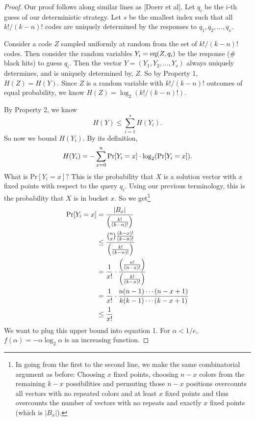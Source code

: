\documentclass[12pt, a4paper]{article}
\begin{document}
\begin{proof}
Our proof follows along similar lines as [Doerr et al]. Let $q_i$ be the $i$-th
guess of our deterministic strategy. Let $s$ be the smallest index such that all
$k!/(k-n)!$ codes are uniquely determined by the responses to $q_1, q_2, \ldots, q_s$.

Consider a code $Z$ sampled uniformly at random from the set of $k!/(k-n)!$ codes. Then
consider the random variables $Y_i = \textnormal{eq}(Z, q_i)$ be the response (\# black
hits) to guess $q_i$.
Then the vector $Y = (Y_1,Y_2,\ldots,Y_s)$ always uniquely determines, and is uniquely
determined by, $Z$. So by Property 1, $H(Z) = H(Y)$. Since $Z$ is a random
variable with $k!/(k-n)!$ outcomes of equal probability, we know
$H(Z) = \log_2(k!/(k-n)!)$.

By Property 2, we know
    \begin{equation*}
    H(Y) \leq \sum_{i=1}^s H(Y_i).
    \end{equation*}
So now we bound $H(Y_i)$. By its definition,
    \begin{equation}
    H(Y_i)=-\sum_{x=0}^n \textnormal{Pr}[Y_i=x]\cdot\log_2(\textnormal{Pr}[Y_{i}=x]).
    \end{equation}
What is Pr$[Y_i = x]$? This is the probability that $X$ is a solution vector with $x$
fixed points with respect to the query $q_i$. Using our previous terminology, this is
the probability that $X$ is in bucket $x$.
So we get\footnote{In going from the first to the second line,
we make the same combinatorial argument as before:
Choosing $x$ fixed points, choosing $n-x$ colors from the remaining $k-x$ possibilities
and permuting those $n-x$ positions overcounts all vectors with no repeated colors
and at least $x$ fixed points and thus overcounts the number of vectors with no
repeats and exactly $x$ fixed points (which is $|B_x|$).}
	\begin{align*}
	\textnormal{Pr}[Y_i = x] &= \frac{|B_x|}{\left(\frac{k!}{(k-n)!}\right)}\\
	&\leq \frac{\binom{n}{x}\frac{(k-x)!}{(k-n)!}}{\left(\frac{k!}{(k-n)!}\right)}\\
	& = \frac{1}{x!}\cdot
	\frac{\left(\frac{n!}{(n-x)!}\right)}{\left(\frac{k!}{(k-x)!}\right)}\\
	&= \frac{1}{x!}\cdot\frac{n(n-1)\cdots(n-x+1)}{k(k-1)\cdots(k-x+1)}\\
	&\leq \frac{1}{x!}
	\end{align*}
\clearpage
We want to plug this upper bound into equation 1.
For $\alpha<1/e$, $f(\alpha)=-\alpha\log_2\alpha$ is an increasing function.

\end{proof}
\end{document}
